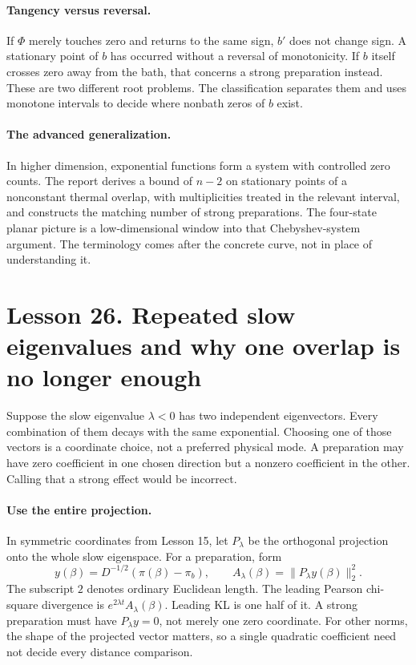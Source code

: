 \documentclass[11pt]{article}
\begin{document}
\paragraph{Tangency versus reversal.}
If $\Phi$ merely touches zero and returns to the same sign, $b'$ does not
change sign. A stationary point of $b$ has occurred without a reversal of
monotonicity. If $b$ itself crosses zero away from the bath, that concerns
a strong preparation instead. These are two different root problems.
The classification separates them and uses monotone intervals to decide
where nonbath zeros of $b$ exist.

\paragraph{The advanced generalization.}
In higher dimension, exponential functions form a system with controlled
zero counts. The report derives a bound of $n-2$ on stationary points of a
nonconstant thermal overlap, with multiplicities treated in the relevant
interval, and constructs the matching number of strong preparations.
The four-state planar picture is a low-dimensional window into that
Chebyshev-system argument. The terminology comes after the concrete curve,
not in place of understanding it.

\clearpage
\section*{Lesson 26. Repeated slow eigenvalues and why one overlap is no longer enough}
Suppose the slow eigenvalue $\lambda<0$ has two independent eigenvectors.
Every combination of them decays with the same exponential. Choosing one
of those vectors is a coordinate choice, not a preferred physical mode.
A preparation may have zero coefficient in one chosen direction but a
nonzero coefficient in the other. Calling that a strong effect would be
incorrect.

\paragraph{Use the entire projection.}
In symmetric coordinates from Lesson 15, let $P_\lambda$ be the orthogonal
projection onto the whole slow eigenspace. For a preparation, form
\[
y(\beta)=D^{-1/2}(\pi(\beta)-\pi_b),
\qquad A_\lambda(\beta)=\|P_\lambda y(\beta)\|_2^2.
\]
The subscript $2$ denotes ordinary Euclidean length. The leading Pearson
chi-square divergence is
$e^{2\lambda t}A_\lambda(\beta)$. Leading KL is one half of it. A strong
preparation must have $P_\lambda y=0$, not merely one zero coordinate.
For other norms, the shape of the projected vector matters, so a single
quadratic coefficient need not decide every distance comparison.
\end{document}

